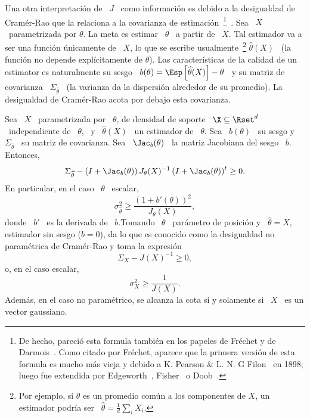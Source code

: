Una  otra  interpretaci\'on  de \  $J$  \  como  informaci\'on  es debido  a  la
desigualdad   de   Cram\'er-Rao   que   la   relaciona  a   la   covarianza   de
estimaci\'on~\footnote{De hecho, pareci\'o esta formula tambi\'en en los papeles
  de  Fr\'echet y  de Darmois~\cite{Fre43,  Dar45}. Como  citado  por Fr\'echet,
  aparece que la primera versi\'on de esta formula es mucho m\'as vieja y debido
  a K.  Pearson  \& L. N.  G Filon~\cite{PeaFil98} en  1898; luego fue extendida
  por          Edgeworth~\cite{Edg08},          Fisher~\cite{Fis25:07}         o
  Doob~\cite{Doo36}.}~\cite{Rao45,  Rao92,  RaoWis47,  Cra46,  Rio07,  CovTho06,
  Fri04, Kay93,  Bos07}.  Sea \  $X$ \ parametrizada  por $\theta$.  La  meta es
estimar \ $\theta$  \ a partir de \  $X$.  Tal estimador va a  ser una funci\'on
\'unicamente de  \ $X$, lo  que se escribe usualmente~\footnote{Por  ejemplo, si
  $\theta$  es  un promedio  com\'un  a los  componentes  de  $X$, un  estimador
  podr\'ia    ser    \     $\widehat{\theta}    =    \frac1d    \sum_i    X_i$.}
$\widehat{\theta}(X)$ \ (la funci\'on  no depende expl\'icitamente de $\theta$).
Las caracter\'isticas de  la calidad de un estimator es  naturalmente su sesgo \
$b(\theta) = \Esp\left[  \widehat{\theta}(X) \right] - \theta$ \  y su matriz de
covarianza  \  $\Sigma_{\widehat{\theta}}$ \  (la  varianza  da la  dispersi\'on
alrededor de su promedio).  La desigualdad de Cram\'er-Rao acota por debajo esta
covarianza.
%
\begin{teorema}
\label{Teo:SZ:CramerRao}
%
  Sea  \ $X$  \  parametrizada por  \ $\theta$,  de  densidad de  soporte \  $\X
  \subseteq \Rset^d$ \ independiente de  \ $\theta$, \ y \ $\widehat{\theta}(X)$
  \  un  estimador   de  \  $\theta$.   Sea  \  $b(\theta)$  \   su  sesgo  y  \
  $\Sigma_{\widehat{\theta}}$ \ su matriz de covarianza.  Sea \ $\Jac_b(\theta)$
  \ la matriz Jacobiana del sesgo \ $b$.  Entonces,
  \[
  \Sigma_{\widehat{\theta}} - \left( I + \Jac_b(\theta) \right) J_\theta(X)^{-1}
  \left( I + \Jac_b(\theta) \right)^t \ge 0.
  \]
  En particular, en el caso \ $\theta$ \ escalar,
  \[
  \sigma_{\widehat{\theta}}^2 \ge \frac{(1+b'(\theta))^2}{J_\theta(X)},
  \]
  donde  \  $b'$ \  es  la  derivada de  \  $b$.\newline  Tomando  \ $\theta$  \
  par\'ametro de posici\'on y \  $\widehat{\theta} = X$, estimador sin sesgo ($b
  =  0$),  da  lo que  es  conocido  como  la  desigualdad no  param\'etrica  de
  Cram\'er-Rao y toma la expresi\'on
  \[
  \Sigma_X - J(X)^{-1} \ge 0,
  \]
  o, en el caso escalar,
  \[
  \sigma_X^2 \ge \frac{1}{J(X)}.
  \]
  Adem\'as, en el caso no param\'etrico, se  alcanza la cota si y solamente si \
  $X$ \ es un vector gaussiano.
\end{teorema}
